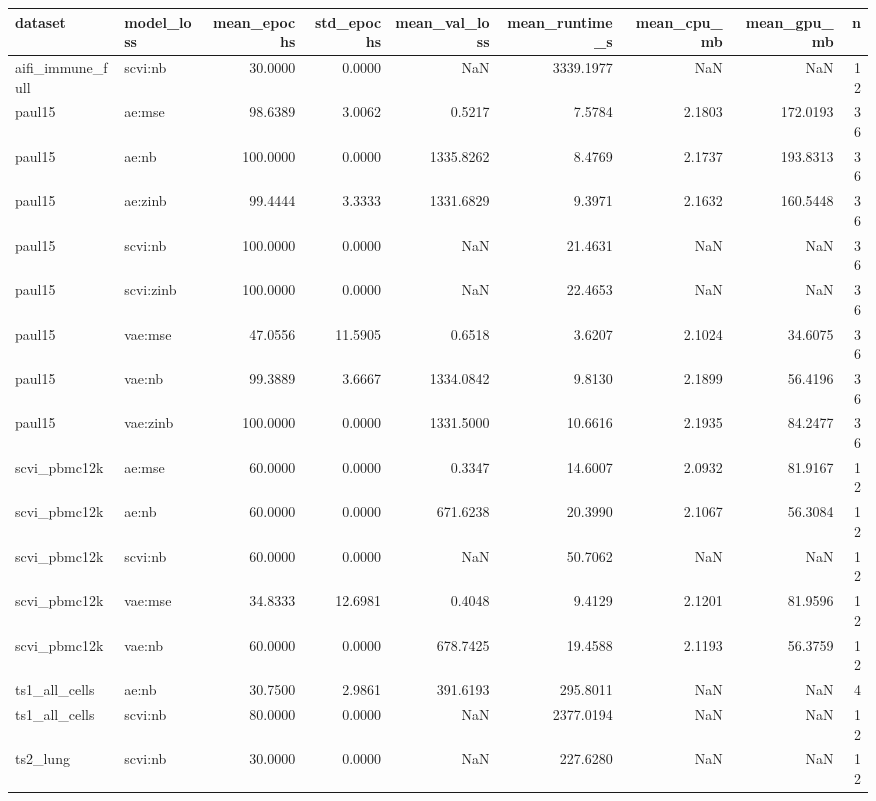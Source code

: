 \begin{tabular}{llrrrrrrr}
\toprule
dataset & model\_loss & mean\_epochs & std\_epochs & mean\_val\_loss & mean\_runtime\_s & mean\_cpu\_mb & mean\_gpu\_mb & n \\
\midrule
aifi\_immune\_full & scvi:nb & 30.0000 & 0.0000 & NaN & 3339.1977 & NaN & NaN & 12 \\
paul15 & ae:mse & 98.6389 & 3.0062 & 0.5217 & 7.5784 & 2.1803 & 172.0193 & 36 \\
paul15 & ae:nb & 100.0000 & 0.0000 & 1335.8262 & 8.4769 & 2.1737 & 193.8313 & 36 \\
paul15 & ae:zinb & 99.4444 & 3.3333 & 1331.6829 & 9.3971 & 2.1632 & 160.5448 & 36 \\
paul15 & scvi:nb & 100.0000 & 0.0000 & NaN & 21.4631 & NaN & NaN & 36 \\
paul15 & scvi:zinb & 100.0000 & 0.0000 & NaN & 22.4653 & NaN & NaN & 36 \\
paul15 & vae:mse & 47.0556 & 11.5905 & 0.6518 & 3.6207 & 2.1024 & 34.6075 & 36 \\
paul15 & vae:nb & 99.3889 & 3.6667 & 1334.0842 & 9.8130 & 2.1899 & 56.4196 & 36 \\
paul15 & vae:zinb & 100.0000 & 0.0000 & 1331.5000 & 10.6616 & 2.1935 & 84.2477 & 36 \\
scvi\_pbmc12k & ae:mse & 60.0000 & 0.0000 & 0.3347 & 14.6007 & 2.0932 & 81.9167 & 12 \\
scvi\_pbmc12k & ae:nb & 60.0000 & 0.0000 & 671.6238 & 20.3990 & 2.1067 & 56.3084 & 12 \\
scvi\_pbmc12k & scvi:nb & 60.0000 & 0.0000 & NaN & 50.7062 & NaN & NaN & 12 \\
scvi\_pbmc12k & vae:mse & 34.8333 & 12.6981 & 0.4048 & 9.4129 & 2.1201 & 81.9596 & 12 \\
scvi\_pbmc12k & vae:nb & 60.0000 & 0.0000 & 678.7425 & 19.4588 & 2.1193 & 56.3759 & 12 \\
ts1\_all\_cells & ae:nb & 30.7500 & 2.9861 & 391.6193 & 295.8011 & NaN & NaN & 4 \\
ts1\_all\_cells & scvi:nb & 80.0000 & 0.0000 & NaN & 2377.0194 & NaN & NaN & 12 \\
ts2\_lung & scvi:nb & 30.0000 & 0.0000 & NaN & 227.6280 & NaN & NaN & 12 \\
\bottomrule
\end{tabular}
